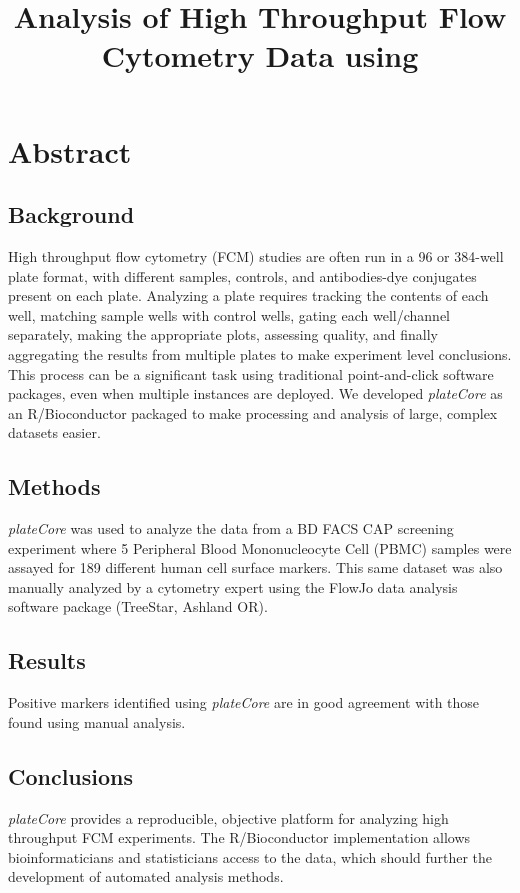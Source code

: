 \documentclass[12pt]{article}
\title{Analysis of High Throughput Flow Cytometry Data using
\Rpackage{plateCore}}
\newcommand{\Rpackage}[1]{{\textit{#1}}}
\begin{document}
\maketitle

\clearpage
\section*{Abstract}
\subsection*{Background}
High throughput flow cytometry (FCM) studies are often run in a 96 or 384-well
plate format, with different samples, controls, and antibodies-dye conjugates
present on each plate. Analyzing a plate requires tracking the contents of each
well, matching sample wells with control wells, gating each well/channel
separately, making the appropriate plots, assessing quality, and finally
aggregating the results from multiple plates to make experiment level
conclusions. This process can be a significant task using traditional
point-and-click software packages, even when multiple instances are deployed.
We developed \Rpackage{plateCore} as an R/Bioconductor packaged to make
processing and analysis of large, complex datasets easier.

\subsection*{Methods}
\Rpackage{plateCore} was used to analyze the data from a BD FACS CAP screening
experiment where 5 Peripheral Blood Mononucleocyte Cell (PBMC) samples  were
assayed for 189 different human cell surface markers. This same dataset was
also manually analyzed by a cytometry expert using the FlowJo data analysis
software package (TreeStar, Ashland OR).

\subsection*{Results}
Positive markers identified using \Rpackage{plateCore} are in good agreement
with those found using manual analysis.

\subsection*{Conclusions}
\Rpackage{plateCore} provides a reproducible, objective platform for analyzing
high throughput FCM experiments. The R/Bioconductor implementation allows
bioinformaticians and statisticians access to the data, which should further
the development of automated analysis methods.
\end{document}
